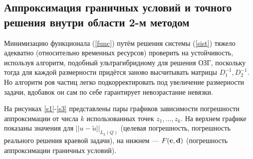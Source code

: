 \documentclass[a4paper]{article}
\begin{document}
\subsection{Аппроксимация граничных условий и точного решения внутри области 2-м методом}
Минимизацию функционала (\ref{func}) путём решения системы (\ref{sist}) тяжело адекватно (относительно временных ресурсов) проверить на устойчивость,
используя алгоритм, подобный ультрагибридному для решения ОЗГ, поскольку тогда для каждой размерности придётся заново высчитывать матрицы $D_1^{-1}, D_2^{-1}$.
Но алгоритм роя частиц легко подкорректировать под увеличение размерности задачи, вдобавок он сам по себе гарантирует невозрастание невязки.

На рисунках \ref{s1}-\ref{s3} представлены пары графиков зависимости погрешности аппроксимации от числа $k$ использованных точек $z_1,\dots, z_k$.
На верхнем графике показаны значения для $||u - \tilde{u} ||_{L_2(Q)}$ (целевая погрешность, погрешность реального решения краевой задачи), на нижнем --- $F({\bf c},{\bf d})$ (погрешность аппроксимации граничных условий).
\end{document}

